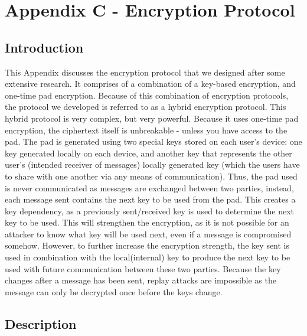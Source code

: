 \section{Appendix C - Encryption Protocol}

\subsection*{Introduction}

This Appendix discusses the encryption protocol that we designed after some extensive research. It comprises of a combination of a key-based encryption, and one-time pad encryption. Because of this combination of encryption protocols, the protocol we developed is referred to as a hybrid encryption protocol. This hybrid protocol is very complex, but very powerful. Because it uses one-time pad encryption, the ciphertext itself is unbreakable - unless you have access to the pad. The pad is generated using two special keys stored on each user's device: one key generated locally on each device, and another key that represents the other user's (intended receiver of messages) locally generated key (which the users have to share with one another via any means of communication). Thus, the pad used is never communicated as messages are exchanged between two parties, instead, each message sent contains the next key to be used from the pad. This creates a key dependency, as a previously sent/received key is used to determine the next key to be used. This will strengthen the encryption, as it is not possible for an attacker to know what key will be used next, even if a message is compromised somehow. However, to further increase the encryption strength, the key sent is used in combination with the local(internal) key to produce the next key to be used with future communication between these two parties. Because the key changes after a message has been sent, replay attacks are impossible as the message can only be decrypted once before the keys change.

\subsection*{Description}

